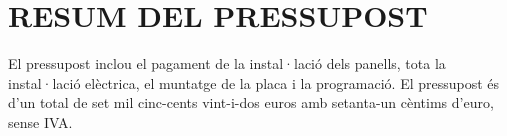\chapter{\uppercase{Resum del pressupost}}
El pressupost inclou el pagament de la instal·lació dels panells, tota la instal·lació elèctrica, el muntatge de la placa i la programació. El pressupost és d'un total de set mil cinc-cents vint-i-dos euros amb setanta-un cèntims d'euro, sense IVA.


\clearpage